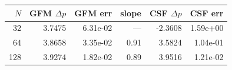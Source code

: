 \begin{tabular}{rrrrrr}
\toprule
$N$ & GFM $\Delta p$ & GFM err & slope & CSF $\Delta p$ & CSF err \\
\midrule
32 & 3.7475 & 6.31e-02 & --- & -2.3608 & 1.59e+00 \\
64 & 3.8658 & 3.35e-02 & 0.91 & 3.5824 & 1.04e-01 \\
128 & 3.9274 & 1.82e-02 & 0.89 & 3.9516 & 1.21e-02 \\
\bottomrule
\end{tabular}
